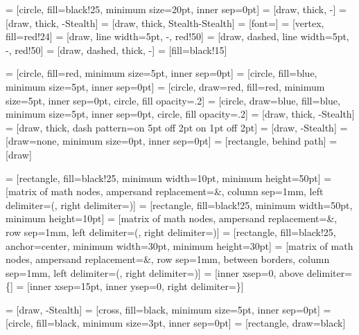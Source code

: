 \usepackage{tikz}
\usetikzlibrary{spy, arrows, arrows.meta, calc, decorations.pathmorphing, decorations.pathreplacing, fit, matrix, patterns, shapes, shapes.multipart, shapes.misc, positioning}


 = [circle, fill=black!25, minimum size=20pt, inner sep=0pt]
 = [draw, thick, -]
 = [draw, thick, -Stealth]
 = [draw, thick, Stealth-Stealth]
 = [font=\small]
 = [vertex, fill=red!24]
 = [draw, line width=5pt, -, red!50]
 = [draw, dashed, line width=5pt, -, red!50]
 = [draw, dashed, thick, -]
 = [fill=black!15]

 = [circle, fill=red, minimum size=5pt, inner sep=0pt]
 = [circle, fill=blue, minimum size=5pt, inner sep=0pt]
 = [circle, draw=red, fill=red, minimum size=5pt, inner sep=0pt, circle, fill opacity=.2]
 = [circle, draw=blue, fill=blue, minimum size=5pt, inner sep=0pt, circle, fill opacity=.2]
 = [draw, thick, -Stealth]
 = [draw, thick, dash pattern=on 5pt off 2pt on 1pt off 2pt]
 = [draw, -Stealth]
 = [draw=none, minimum size=0pt, inner sep=0pt]
 = [rectangle, behind path]
 = [draw]

 = [rectangle, fill=black!25, minimum width=10pt, minimum height=50pt]
 = [matrix of math nodes, ampersand replacement=\&, column sep=1mm, left delimiter=(, right delimiter=)]
 = [rectangle, fill=black!25, minimum width=50pt, minimum height=10pt]
 = [matrix of math nodes, ampersand replacement=\&, row sep=1mm, left delimiter=(, right delimiter=)]
 = [rectangle, fill=black!25, anchor=center, minimum width=30pt, minimum height=30pt]
 = [matrix of math nodes, ampersand replacement=\&, row sep={1mm, between borders}, column sep=1mm, left delimiter=(, right delimiter=)]
 = [inner xsep=0, above delimiter=\{]
 = [inner xsep=15pt, inner ysep=0, right delimiter=\}]

 = [draw, -Stealth]
 = [cross, fill=black, minimum size=5pt, inner sep=0pt]
 = [circle, fill=black, minimum size=3pt, inner sep=0pt]
 = [rectangle, draw=black]
